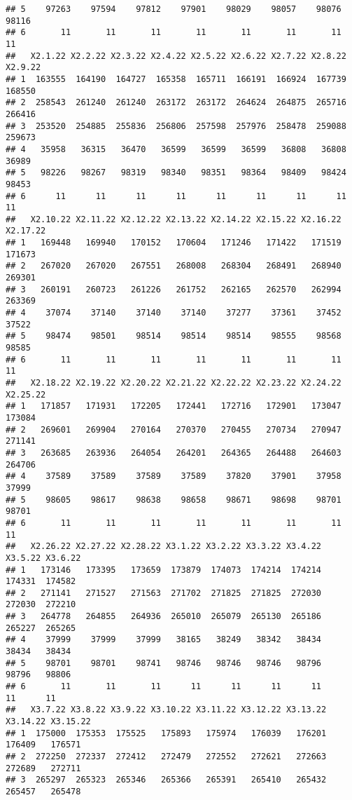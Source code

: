 \documentclass[
]{article}
\begin{document}
\begin{verbatim}
## 5    97263    97594    97812    97901    98029    98057    98076    98116
## 6       11       11       11       11       11       11       11       11
##   X2.1.22 X2.2.22 X2.3.22 X2.4.22 X2.5.22 X2.6.22 X2.7.22 X2.8.22 X2.9.22
## 1  163555  164190  164727  165358  165711  166191  166924  167739  168550
## 2  258543  261240  261240  263172  263172  264624  264875  265716  266416
## 3  253520  254885  255836  256806  257598  257976  258478  259088  259673
## 4   35958   36315   36470   36599   36599   36599   36808   36808   36989
## 5   98226   98267   98319   98340   98351   98364   98409   98424   98453
## 6      11      11      11      11      11      11      11      11      11
##   X2.10.22 X2.11.22 X2.12.22 X2.13.22 X2.14.22 X2.15.22 X2.16.22 X2.17.22
## 1   169448   169940   170152   170604   171246   171422   171519   171673
## 2   267020   267020   267551   268008   268304   268491   268940   269301
## 3   260191   260723   261226   261752   262165   262570   262994   263369
## 4    37074    37140    37140    37140    37277    37361    37452    37522
## 5    98474    98501    98514    98514    98514    98555    98568    98585
## 6       11       11       11       11       11       11       11       11
##   X2.18.22 X2.19.22 X2.20.22 X2.21.22 X2.22.22 X2.23.22 X2.24.22 X2.25.22
## 1   171857   171931   172205   172441   172716   172901   173047   173084
## 2   269601   269904   270164   270370   270455   270734   270947   271141
## 3   263685   263936   264054   264201   264365   264488   264603   264706
## 4    37589    37589    37589    37589    37820    37901    37958    37999
## 5    98605    98617    98638    98658    98671    98698    98701    98701
## 6       11       11       11       11       11       11       11       11
##   X2.26.22 X2.27.22 X2.28.22 X3.1.22 X3.2.22 X3.3.22 X3.4.22 X3.5.22 X3.6.22
## 1   173146   173395   173659  173879  174073  174214  174214  174331  174582
## 2   271141   271527   271563  271702  271825  271825  272030  272030  272210
## 3   264778   264855   264936  265010  265079  265130  265186  265227  265265
## 4    37999    37999    37999   38165   38249   38342   38434   38434   38434
## 5    98701    98701    98741   98746   98746   98746   98796   98796   98806
## 6       11       11       11      11      11      11      11      11      11
##   X3.7.22 X3.8.22 X3.9.22 X3.10.22 X3.11.22 X3.12.22 X3.13.22 X3.14.22 X3.15.22
## 1  175000  175353  175525   175893   175974   176039   176201   176409   176571
## 2  272250  272337  272412   272479   272552   272621   272663   272689   272711
## 3  265297  265323  265346   265366   265391   265410   265432   265457   265478

\end{verbatim}
\end{document}
